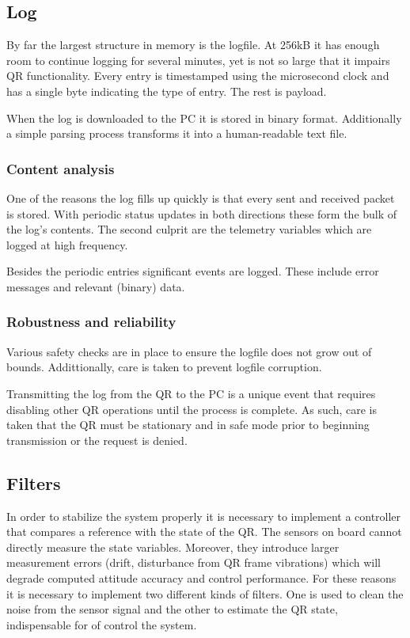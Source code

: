 \documentclass[11pt]{article}
\begin{document}
\subsection{Log}
By far the largest structure in memory is the logfile. At 256kB it has enough room to continue logging for several minutes, yet is not so large that it impairs QR functionality. Every entry is timestamped using the microsecond clock and has a single byte indicating the type of entry. The rest is payload.

When the log is downloaded to the PC it is stored in binary format. Additionally a simple parsing process transforms it into a human-readable text file.

\subsubsection{Content analysis}
One of the reasons the log fills up quickly is that every sent and received packet is stored. With periodic status updates in both directions these form the bulk of the log's contents. The second culprit are the telemetry variables which are logged at high frequency.

Besides the periodic entries significant events are logged. These include error messages and relevant (binary) data.

\subsubsection{Robustness and reliability}
Various safety checks are in place to ensure the logfile does not grow out of bounds. Addittionally, care is taken to prevent logfile corruption.

Transmitting the log from the QR to the PC is a unique event that requires disabling other QR operations until the process is complete. As such, care is taken that the QR must be stationary and in safe mode prior to beginning transmission or the request is denied.



\subsection{Filters}
\label{sec:filters}

In order to stabilize the system properly it is necessary to implement
a controller that compares a reference with the state of the QR. The
sensors on board cannot directly measure the state variables. Moreover,
they introduce larger measurement errors (drift, disturbance from
QR frame vibrations) which will degrade computed attitude accuracy
and control performance. For these reasons it is necessary
to implement two different kinds of filters. One is used to clean
the noise from the sensor signal and the other to estimate the QR
state, indispensable for of control the system.
\end{document}
